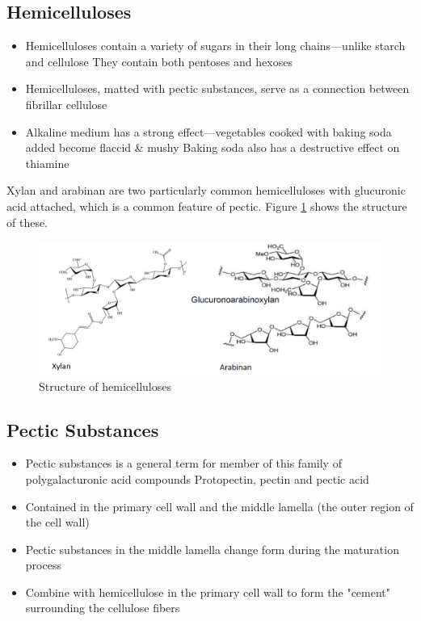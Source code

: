 \subsection*{Hemicelluloses}
\begin{itemize}
    \item Hemicelluloses contain a variety of sugars in their long
    chains—unlike starch and cellulose
    \subitem They contain both pentoses and hexoses
    
    \item Hemicelluloses, matted with pectic substances, serve as a
    connection between fibrillar cellulose
    
    \item Alkaline medium has a strong effect—vegetables cooked
    with baking soda added become flaccid \& mushy
    \subitem Baking soda also has a destructive effect on thiamine
\end{itemize}

\vspace{0.5em}
Xylan and arabinan are two particularly common hemicelluloses with
glucuronic acid attached, which is a common feature of pectic. Figure \ref{fig:L01_hemicelluloses} shows the structure of these.
\begin{figure}[h]
    \centering
    \includegraphics[width=\textwidth]{figures/L01_hemicelluloses.png}
    \caption{Structure of hemicelluloses}
    \label{fig:L01_hemicelluloses}
\end{figure}

\subsection*{Pectic Substances}

\begin{itemize}
    \item Pectic substances is a general term for member
    of this family of polygalacturonic acid compounds
    \subitem Protopectin, pectin and pectic acid
    
    \item Contained in the primary cell wall and the middle lamella (the
    outer region of the cell wall)
    
    \item Pectic substances in the middle lamella change form during the
    maturation process
    
    \item Combine with hemicellulose in the primary cell wall to form the
    "cement" surrounding the cellulose fibers
\end{itemize}

